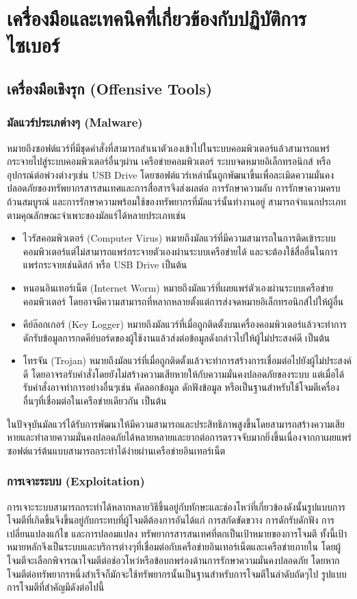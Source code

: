 \documentclass[../th_cyber_warfare_distilled.tex]{subfiles}
\begin{document}
\chapter{เครื่องมือและเทคนิคที่เกี่ยวข้องกับปฏิบัติการไซเบอร์}
\label{chapter:cyberwar_tools}

\section{เครื่องมือเชิงรุก (Offensive Tools)}
\subsection{มัลแวร์ประเภต่างๆ (Malware)} หมายถึงซอฟต์แวร์ที่มีชุดคำสั่งที่สามารถสำเนาตัวเองเข้าไปในระบบคอมพิวเตอร์แล้วสามารถแพร่กระจายไปสู่ระบบคอมพิวเตอร์อื่นๆผ่าน เครือข่ายคอมพิวเตอร์ ระบบจดหมายอิเล็กทรอนิกส์ หรืออุปกรณ์ต่อพ่วงต่างๆเช่น USB Drive โดยซอฟต์แวร์เหล่านั้นถูกพัฒนาขึ้นเพื่อละเมิดความมั่นคงปลอดภัยของทรัพยากรสารสนเทศและการสื่อสารจึงส่งผลต่อ การรักษาความลับ การรักษาความครบถ้วนสมบูรณ์ และการรักษาความพร้อมใช้ของทรัพยากรที่มัลแวร์นั้นทำงานอยู่ สามารถจำแนกประเภทตามคุณลักษณะจำเพาะของมัลแร์ได้หลายประเภทเช่น 
\begin{itemize}
	\item ไวรัสคอมพิวเตอร์ (Computer Virus) หมายถึงมัลแวร์ที่มีความสามารถในการติดเข้าระบบคอมพิวเตอร์แต่ไม่สามารถแพร่กระจายตัวเองผ่านระบบเครือข่ายได้ และจะต้องใช้สื่ออื่นในการแพร่กระจายเช่นดิสก์ หรือ USB Drive เป็นต้น
	\item หนอนอินเทอร์เน็ต (Internet Worm) หมายถึงมัลแวร์ที่เผยแพร่ตัวเองผ่านระบบเครือข่ายคอมพิวเตอร์ โดยอาจมีความสามารถที่หลากหลายตั้งแต่การส่งจดหมายอิเล็กทรอนิกส์ไปให้ผู้อื่น 
	\item คีย์ล๊อกเกอร์ (Key Logger) หมายถึงมัลแวร์ที่เมื่อถูกติดตั้งบนเครื่องคอมพิวเตอร์แล้วจะทำการดักรับข้อมูลการกดคีย์บอร์ดของผู้ใช้งานแล้วส่งต่อข้อมูลดังกล่าวไปให้ผู้ไม่ประสงค์ดี เป็นต้น
	\item โทรจัน (Trojan) หมายถึงมัลแวร์ที่เมื่อถูกติดตั้งแล้วจะทำการสร้างการเชื่อมต่อไปยังผู้ไม่ประสงค์ดี โดยอาจรอรับคำสั่งโดยยังไม่สร้างความเสียหายให้กับความมั่นคงปลอดภัยของระบบ แต่เมื่อได้รับคำสั่งอาจทำการอย่างอื่นๆเช่น คัดลอกข้อมูล ดักฟังข้อมูล หรือเป็นฐานสำหรับใช้โจมตีเครื่องอื่นๆที่เชื่อมต่อในเครือข่ายเดียวกัน เป็นต้น
\end{itemize}
ในปัจจุบันมัลแวร์ได้รับการพัฒนาให้มีความสามารถและประสิทธิภาพสูงขึ้นโดยสามารถสร้างความเสียหายและทำลายความมั่นคงปลอดภัยได้หลายหลายและยากต่อการตรวจจับมากยิ่งขึ้นเนื่องจากกาเผยแพร่ซอฟต์แวร์ต้นแบบสามารถกระทำได้ง่ายผ่านเครือข่ายอินเทอร์เน็ต
\subsection{การเจาะระบบ (Exploitation)}
การเจาะระบบสามารถกระทำได้หลากหลายวิธีขึ้นอยู่กับทักษะและช่องโหว่ที่เกี่ยวข้องดังนั้นรูปแบบการโจมตีที่เกิดขึ้นจึงขึ้นอยู่กับกระทบที่ผู้โจมตีต้องการอันได้แก่ การสกัดขัดขวาง การดักรับดักฟัง การเปลี่ยนแปลงแก้ไข และการปลอมแปลง ทรัพยากรสารสนเทศที่ตกเป็นเป้าหมายของการโจมตี ทั้งนี้เป้าหมายหลักจึงเป็นระบบและบริการต่างๆที่เชื่อมต่อกับเครือข่ายอินเทอร์เน็ตและเครือข่ายภายใน โดยผู้โจมตีจะเลือกพิจารณาโจมตีต่อช่อวโหว่หรือข้อบกพร่องด้านการรักษาความมั่นคงปลอดภัย โดยหากโจมตีต่อทรัพยากรหนึ่งสำเร็จก็มักจะใช้ทรัพยากรนั้นเป็นฐานสำหรับการโจมตีในลำดับถัดๆไป รูปแบบการโจมตีที่สำคัญมีดังต่อไปนี้
\end{document}
